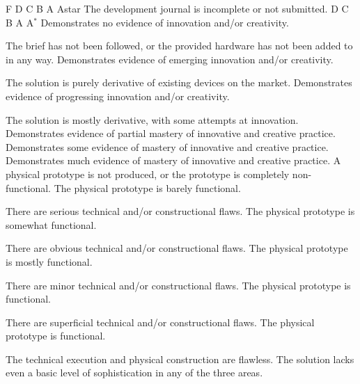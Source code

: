 \documentclass{../fal_assignment}
\begin{document}
\begin{markingrubric}
        \grade\fail F
        \grade D
        \grade C
        \grade B
        \grade A
        \grade Astar
        \grade\fail The development journal is incomplete or not submitted.
        \grade D
        \grade C
        \grade B
        \grade A
        \grade A$^*$
        \grade\fail Demonstrates no evidence of innovation and/or creativity.
            \par The brief has not been followed, or the provided hardware has not been added to in any way.
        \grade Demonstrates evidence of emerging innovation and/or creativity.
            \par The solution is purely derivative of existing devices on the market.
        \grade Demonstrates evidence of progressing innovation and/or creativity.
            \par The solution is mostly derivative, with some attempts at innovation.
        \grade Demonstrates evidence of partial mastery of innovative and creative practice.
        \grade Demonstrates some evidence of mastery of innovative and creative practice.
        \grade Demonstrates much evidence of mastery of innovative and creative practice.
        \grade\fail A physical prototype is not produced, or the prototype is completely non-functional.
        \grade The physical prototype is barely functional.
            \par There are serious technical and/or constructional flaws.
        \grade The physical prototype is somewhat functional.
            \par There are obvious technical and/or constructional flaws.
        \grade The physical prototype is mostly functional.
            \par There are minor technical and/or constructional flaws.
        \grade The physical prototype is functional.
            \par There are superficial technical and/or constructional flaws.
        \grade The physical prototype is functional.
            \par The technical execution and physical construction are flawless.
        \grade\fail The solution lacks even a basic level of sophistication in any of the three areas.

\end{markingrubric}
\end{document}

